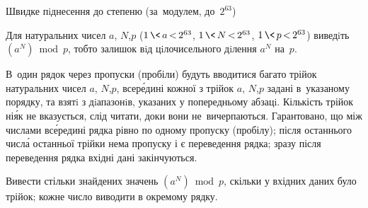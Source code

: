 \begin{problemAllDefault}{Швидке пiднесення до степеню (за~модулем, до~$2^{63}$)}

Для натуральних чисел $a$, $N$,\nolinebreak[3] $p$
(${1\,{\<}\,a\,{<}\,2^{63}}$, 
${1\,{\<}\,N\,{<}\,2^{63}}$, 
${1\,{\<}\,p\,{<}\,2^{63}}$)
виведiть $(a^N) \bmod p$, тобто залишок вiд цiлочисельного дiлення $a^N$ на~$p$.


\InputFile 
В~один рядок через пропуски (пробіли) будуть вводитися багато трійок натуральних чисел $a$, $N$,\nolinebreak[3] $p$, 
всер\'{е}дині кожної з трійок $a$, $N$,\nolinebreak[3] $p$ задані в~указаному порядку, 
та взятi з дiапазонiв, указаних у попередньому абзацi. 
Кількість трійок ні\'{я}к не вказується, слід читати, доки вони не~вичерпаються.
Гарантовано, що між числами вс\'{е}редині рядка рівно по одному пропуску (пробілу);
після останнього числ\'{а} останньої трійки нема пропуску і є переведення рядка;
зразу після переведення рядка вхідні дані закінчуються.

\OutputFile	
Вивести стільки знайдених значень $(a^N) \bmod p$, скільки у вхідних даних було трійок;
кожне число виводити в окремому рядку.



\end{problemAllDefault}